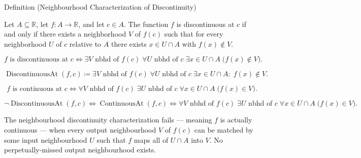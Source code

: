 
\begin{definitionbox}{Definition (Neighbourhood Characterization of Discontinuity)}
\begin{definition}
\label{def:neighborhood-discontinuity-at-a-point}
Let $A \subseteq \mathbb{R}$, let $f \colon A \to \mathbb{R}$, and let $c \in A$. The function $f$ is discontinuous at $c$ if and only if there exists a neighborhood $V$ of $f(c)$ such that for every neighborhood $U$ of $c$ relative to $A$ there exists $x \in U \cap A$ with $f(x) \notin V$.
\end{definition}
\end{definitionbox}

\begin{remark*}
\[
f \text{ is discontinuous at } c
\Longleftrightarrow
\exists V \text{ nbhd of } f(c)\;
\forall U \text{ nbhd of } c\;
\exists x \in U \cap A\; \bigl(f(x) \notin V\bigr).
\]
\end{remark*}

\begin{remark*}
\[
\operatorname{DiscontinuousAt}(f,c) \coloneqq
\exists V \text{ nbhd of } f(c)\;
\forall U \text{ nbhd of } c\;
\exists x \in U \cap A:\; f(x) \notin V.
\]
\end{remark*}

\begin{remark*}
\[
f \text{ is continuous at } c
\Longleftrightarrow
\forall V \text{ nbhd of } f(c)\;
\exists U \text{ nbhd of } c\;
\forall x \in U \cap A\; \bigl(f(x) \in V\bigr).
\]
\end{remark*}

\begin{remark*}
\[
\neg \operatorname{DiscontinuousAt}(f,c)
\Longleftrightarrow
\operatorname{ContinuousAt}(f,c)
\Longleftrightarrow
\forall V \text{ nbhd of } f(c)\;
\exists U \text{ nbhd of } c\;
\forall x \in U \cap A\; \bigl(f(x) \in V\bigr).
\]
\end{remark*}

\begin{remark*}
The neighbourhood discontinuity characterization fails --- meaning $f$ is actually continuous --- when every output neighbourhood $V$ of $f(c)$ can be matched by some input neighbourhood $U$ such that $f$ maps all of $U \cap A$ into $V$. No perpetually-missed output neighbourhood exists.
\end{remark*}

